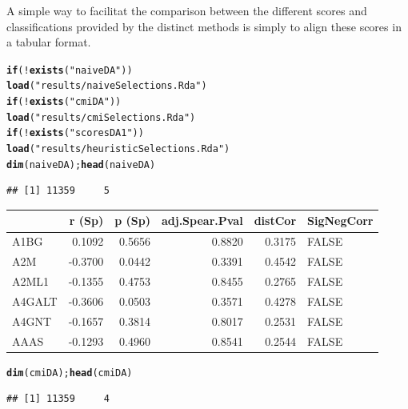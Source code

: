 \documentclass[a4paper,10pt]{article}\usepackage[]{graphicx}\usepackage[]{color}
\makeatletter
\newcommand{\hlstr}[1]{\textcolor[rgb]{0.192,0.494,0.8}{#1}}%
\newcommand{\hlopt}[1]{\textcolor[rgb]{0,0,0}{#1}}%
\newcommand{\hlstd}[1]{\textcolor[rgb]{0.345,0.345,0.345}{#1}}%
\newcommand{\hlkwa}[1]{\textcolor[rgb]{0.161,0.373,0.58}{\textbf{#1}}}%
\newcommand{\hlkwd}[1]{\textcolor[rgb]{0.737,0.353,0.396}{\textbf{#1}}}%
\newenvironment{kframe}{%
 \def\at@end@of@kframe{}%
 \ifinner\ifhmode%
  \def\at@end@of@kframe{\end{minipage}}%
  \begin{minipage}{\columnwidth}%
 \fi\fi%
 \def\FrameCommand##1{\hskip\@totalleftmargin \hskip-\fboxsep
 \colorbox{shadecolor}{##1}\hskip-\fboxsep
     \hskip-\linewidth \hskip-\@totalleftmargin \hskip\columnwidth}%
 \MakeFramed {\advance\hsize-\width
   \@totalleftmargin\z@ \linewidth\hsize
   \@setminipage}}%
 {\par\unskip\endMakeFramed%
 \at@end@of@kframe}
\newenvironment{knitrout}{}{} %
\makeatother
\begin{document}
A simple way to facilitat the comparison between the different scores and classifications provided by the distinct methods is simply to align these scores in a tabular format.

\begin{knitrout}
\color{fgcolor}\begin{kframe}
\begin{alltt}
\hlkwa{if} \hlstd{(}\hlopt{!}\hlkwd{exists} \hlstd{(}\hlstr{"naiveDA"}\hlstd{))}
  \hlkwd{load}\hlstd{(}\hlstr{"results/naiveSelections.Rda"}\hlstd{)}
\hlkwa{if} \hlstd{(}\hlopt{!}\hlkwd{exists} \hlstd{(}\hlstr{"cmiDA"}\hlstd{))}
  \hlkwd{load}\hlstd{(}\hlstr{"results/cmiSelections.Rda"}\hlstd{)}
\hlkwa{if} \hlstd{(}\hlopt{!}\hlkwd{exists} \hlstd{(}\hlstr{"scoresDA1"}\hlstd{))}
  \hlkwd{load}\hlstd{(}\hlstr{"results/heuristicSelections.Rda"}\hlstd{)}
\hlkwd{dim}\hlstd{(naiveDA);} \hlkwd{head}\hlstd{(naiveDA)}
\end{alltt}
\begin{verbatim}
## [1] 11359     5
\end{verbatim}
\end{kframe}


\begin{tabular}{l|r|r|r|r|l}
\hline
  & r (Sp) & p (Sp) & adj.Spear.Pval & distCor & SigNegCorr\\
\hline
A1BG & 0.1092 & 0.5656 & 0.8820 & 0.3175 & FALSE\\
\hline
A2M & -0.3700 & 0.0442 & 0.3391 & 0.4542 & FALSE\\
\hline
A2ML1 & -0.1355 & 0.4753 & 0.8455 & 0.2765 & FALSE\\
\hline
A4GALT & -0.3606 & 0.0503 & 0.3571 & 0.4278 & FALSE\\
\hline
A4GNT & -0.1657 & 0.3814 & 0.8017 & 0.2531 & FALSE\\
\hline
AAAS & -0.1293 & 0.4960 & 0.8541 & 0.2544 & FALSE\\
\hline
\end{tabular}\begin{kframe}\begin{alltt}
\hlkwd{dim}\hlstd{(cmiDA);} \hlkwd{head}\hlstd{(cmiDA)}
\end{alltt}
\begin{verbatim}
## [1] 11359     4
\end{verbatim}
\end{kframe}



\end{knitrout}
\end{document}
